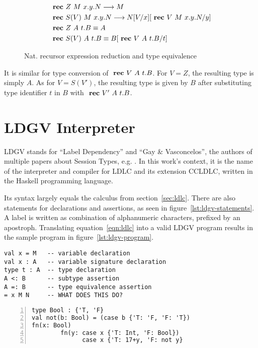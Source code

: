 \begin{figure}
 \begin{align*}
 & \text{ \textbf{rec} } Z~M~x.y.N \longrightarrow M \\
 & \text{ \textbf{rec} } S(V)~M~x.y.N \longrightarrow N [V/x] [\text{ \textbf{rec} } V~M~x.y.N/y] \\
 & \text{ \textbf{rec} } Z~A~t.B \equiv A \\
 & \text{ \textbf{rec} } S(V)~A~t.B \equiv B [\text{ \textbf{rec} } V~A~t.B/t]
\end{align*}
\caption{Nat. recursor expression reduction and type equivalence}
\label{fig:ldlc-rec-exp}
\end{figure}


It is similar for type conversion of $\text{ \textbf{rec} } V~A~t.B$. For $V=Z$, the resulting type is simply $A$. As for $V=S(V')$, the resulting type is given by $B$ after substituting type identifier $t$ in $B$ with $\text{ \textbf{rec} } V'~A~t.B$.

\section{LDGV Interpreter}

LDGV stands for ``Label Dependency'' and ``Gay \& Vasconcelos'', the authors of multiple papers about Session Types, e.g. \cite{gayvasconcelos2010}. In this work's context, it is the name of the interpreter and compiler for LDLC and its extension CCLDLC, written in the Haskell programming language.

Its syntax largely equals the calculus from section~\ref{sec:ldlc}. There are also statements for declarations and assertions, as seen in figure~\ref{lst:ldgv-statements}.
A label is written as combination of alphanumeric characters, prefixed by an apostroph. Translating equation~\ref{eqn:ldlc} into a valid LDGV program results in the sample program in figure~\ref{lst:ldgv-program}.

\begin{lstlisting}[language=ldgv,caption=Statements in LDGV,label=lst:ldgv-statements]
val x = M   -- variable declaration
val x : A   -- variable signature declaration
type t : A  -- type declaration
A <: B      -- subtype assertion
A =: B      -- type equivalence assertion
= x M N     -- WHAT DOES THIS DO?
\end{lstlisting}

\begin{lstlisting}[language=ldgv,numbers=left,caption=Sample LDGV program,label=lst:ldgv-program]
type Bool : {'T, 'F}
val not(b: Bool) = (case b {'T: 'F, 'F: 'T})
fn(x: Bool)
        fn(y: case x {'T: Int, 'F: Bool})
              case x {'T: 17+y, 'F: not y}
\end{lstlisting}

